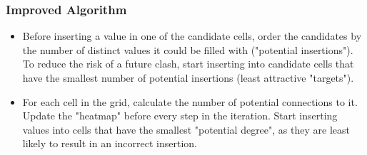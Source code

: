 \subsubsection*{Improved Algorithm}
\begin{itemize}
\item Before inserting a value in one of the candidate cells, order the candidates by the number of distinct values it could be filled with ("potential insertions"). To reduce the risk of a future clash, start inserting into candidate cells that have the smallest number of potential insertions (least attractive "targets").
\item For each cell in the grid, calculate the number of potential connections to it. Update the "heatmap" before every step in the iteration. Start inserting values into cells that have the smallest "potential degree", as they are least likely to result in an incorrect insertion.
\end{itemize}


